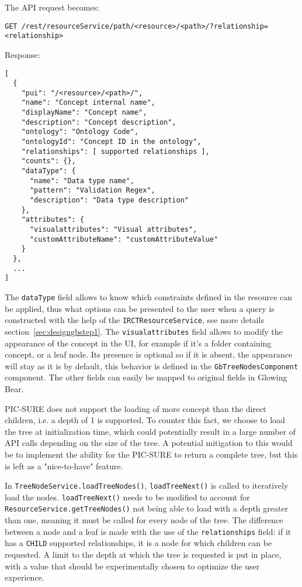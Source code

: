 The API request becomes:
\begin{verbatim}
GET /rest/resourceService/path/<resource>/<path>/?relationship=<relationship>
\end{verbatim}

Response:
\begin{verbatim}
[
  {
    "pui": "/<resource>/<path>/",
    "name": "Concept internal name",
    "displayName": "Concept name",
    "description": "Concept description",
    "ontology": "Ontology Code",
    "ontologyId": "Concept ID in the ontology",
    "relationships": [ supported relationships ],
    "counts": {},
    "dataType": {
      "name": "Data type name",
      "pattern": "Validation Regex",
      "description": "Data type description"
    },
    "attributes": {
      "visualattributes": "Visual attributes",
      "customAttributeName": "customAttributeValue"
    }
  },
  ...
]
\end{verbatim}

The \verb|dataType| field allows to know which constraints defined in the resource can be applied, thus what options can be presented to the user when a query is constructed with the help of the \verb|IRCTResourceService|, see more details section~\ref{sec:designgbstep1}.
The \verb|visualattributes| field allows to modify the appearance of the concept in the UI, for example if it's a folder containing concept, or a leaf node. 
Its presence is optional so if it is absent, the appearance will stay as it is by default, this behavior is defined in the \verb|GbTreeNodesComponent| component.
The other fields can easily be mapped to original fields in Glowing Bear.

PIC-SURE does not support the loading of more concept than the direct children, i.e. a depth of 1 is supported.
To counter this fact, we choose to load the tree at initialization time, which could potentially result in a large number of API calls depending on the size of the tree.
A potential mitigation to this would be to implement the ability for the PIC-SURE to return a complete tree, but this is left as a "nice-to-have" feature.

In \verb|TreeNodeService.loadTreeNodes()|, \verb|loadTreeNext()| is called to iteratively load the nodes.
\verb|loadTreeNext()| needs to be modified to account for \verb|ResourceService.getTreeNodes()| not being able to load with a depth greater than one, meaning it must be called for every node of the tree.
The difference between a node and a leaf is made with the use of the \verb|relationships| field: if it has a \verb|CHILD| supported relationships, it is a node for which children can be requested.
A limit to the depth at which the tree is requested is put in place, with a value that should be experimentally chosen to optimize the user experience.

